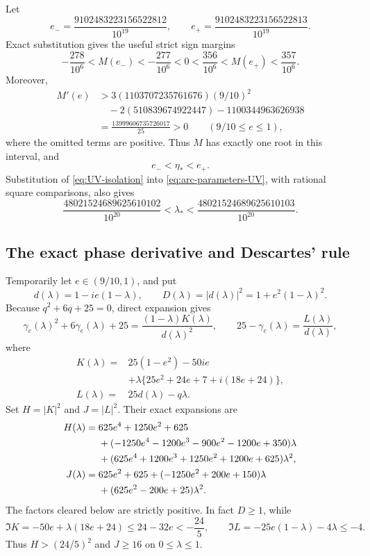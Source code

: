 \documentclass[11pt,reqno,letterpaper]{amsart}
\numberwithin{equation}{section}
\theoremstyle{definition}
\theoremstyle{remark}
\begin{document}
Let
\[
 e_-=\frac{9102483223156522812}{10^{19}},\qquad
 e_+=\frac{9102483223156522813}{10^{19}}.
\]
Exact substitution gives the useful strict sign margins
\begin{equation}\label{eq:eta-endpoint-signs}
 -\frac{278}{10^6}<M(e_-)<-\frac{277}{10^6}<0
 <\frac{356}{10^6}<M(e_+)<\frac{357}{10^6}.
\end{equation}
Moreover,
\begin{align*}
 M'(e)
 &>3(1103707235761676)(9/10)^2\\
 &\quad-2(510839674922447)-1100344963626938\\
 &=\frac{13999606735726017}{25}>0
 \qquad(9/10\leq e\leq1),
\end{align*}
where the omitted terms are positive.  Thus \(M\) has exactly one root
in this interval, and
\begin{equation}\label{eq:eta-isolation}
 e_-<\eta_*<e_+.
\end{equation}
Substitution of \eqref{eq:UV-isolation} into
\eqref{eq:arc-parameters-UV}, with rational square comparisons, also
gives
\begin{equation}\label{eq:lambda-star-isolation}
 \frac{48021524689625610102}{10^{20}}
 <\lambda_*<
 \frac{48021524689625610103}{10^{20}}.
\end{equation}

\subsection{The exact phase derivative and Descartes' rule}
\label{subsec:exact-phase-derivative}

Temporarily let \(e\in(9/10,1)\), and put
\[
 d(\lambda)=1-ie(1-\lambda),\qquad
 D(\lambda)=|d(\lambda)|^2=1+e^2(1-\lambda)^2.
\]
Because \(q^2+6q+25=0\), direct expansion gives
\begin{equation}\label{eq:arc-factorizations}
 \gamma_e(\lambda)^2+6\gamma_e(\lambda)+25
 =\frac{(1-\lambda)K(\lambda)}{d(\lambda)^2},
 \qquad
 25-\gamma_e(\lambda)=\frac{L(\lambda)}{d(\lambda)},
\end{equation}
where
\[
 \begin{split}
 K(\lambda)={}&25(1-e^2)-50ie\\
 &+\lambda\{25e^2+24e+7+i(18e+24)\},\\
 L(\lambda)={}&25d(\lambda)-q\lambda.
 \end{split}
\]
Set \(H=|K|^2\) and \(J=|L|^2\).  Their exact expansions are
\begin{align}
 H(\lambda)={}&625e^4+1250e^2+625\notag\\
 &+(-1250e^4-1200e^3-900e^2-1200e+350)\lambda\notag\\
 &+(625e^4+1200e^3+1250e^2+1200e+625)\lambda^2,
 \label{eq:H-expanded}\\
 J(\lambda)={}&625e^2+625+(-1250e^2+200e+150)\lambda\notag\\
 &+(625e^2-200e+25)\lambda^2.
 \label{eq:J-expanded}
\end{align}
The factors cleared below are strictly positive.  In fact \(D\geq1\),
while
\[
 \Im K=-50e+\lambda(18e+24)\leq24-32e<-\frac{24}{5},
 \qquad
 \Im L=-25e(1-\lambda)-4\lambda\leq-4.
\]
Thus \(H>(24/5)^2\) and \(J\geq16\) on \(0\leq\lambda\leq1\).
\end{document}
